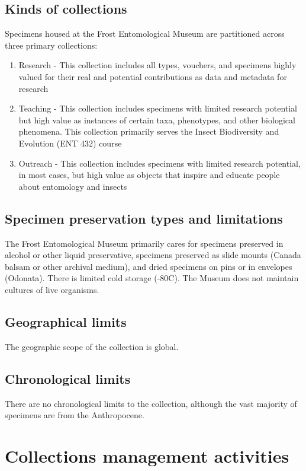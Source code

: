 \documentclass[letterpaper, 11pt]{article}
\begin{document}
\subsection{Kinds of collections}
Specimens housed at the Frost Entomological Museum are partitioned across three primary collections:
\begin{enumerate}
\item Research - This collection includes all types, vouchers, and specimens highly valued for their real and potential contributions as data and metadata for research
\item Teaching - This collection includes specimens with limited research potential but high value as instances of certain taxa, phenotypes, and other biological phenomena. This collection primarily serves the Insect Biodiversity and Evolution (ENT 432) course
\item Outreach - This collection includes specimens with limited research potential, in most cases, but high value as objects that inspire and educate people about entomology and insects
\end{enumerate}

\subsection{Specimen preservation types and limitations}
The Frost Entomological Museum primarily cares for specimens preserved in alcohol or other liquid preservative, specimens preserved as slide mounts (Canada balsam or other archival medium), and dried specimens on pins or in envelopes (Odonata). There is limited cold storage (-80\textdegree{}C). The Museum does not maintain cultures of live organisms.

\subsection{Geographical limits}
The geographic scope of the collection is global.

\subsection{Chronological limits}
There are no chronological limits to the collection, although the vast majority of specimens are from the Anthropocene.

\clearpage
\section{Collections management activities}
\end{document}
